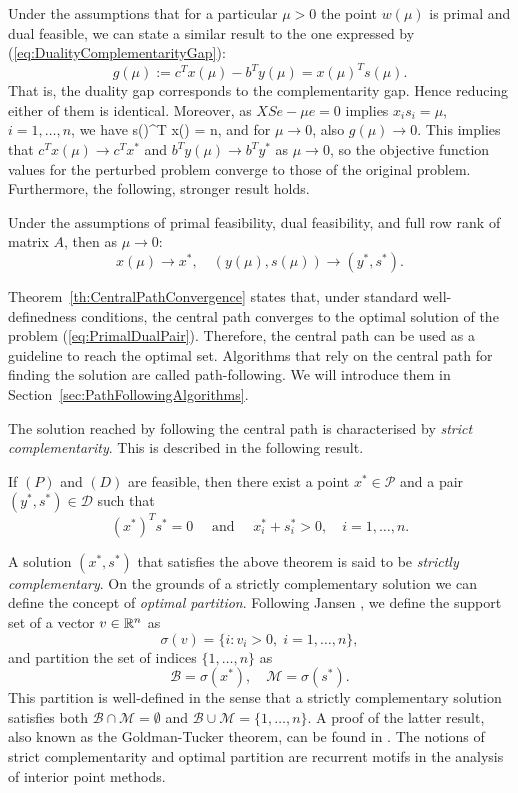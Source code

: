 
Under the assumptions that for a particular $\mu > 0$ the point
$w(\mu)$ is primal and dual feasible, we can state
a similar result to the one expressed by 
(\ref{eq:DualityComplementarityGap}):
\[
  g(\mu) := c^Tx(\mu) - b^T y(\mu) = x(\mu)^T s(\mu).
\]
That is, the duality gap corresponds to the complementarity gap.
Hence reducing either of them is identical.
Moreover, as $XSe - \mu e = 0$ implies $x_is_i = \mu$, $i = 1, \ldots, n$, 
we have
\be  \label{eq:AverageComplementarity}
   s(\mu)^T x(\mu) = n\mu,
\ee
and for $\mu \to 0$, also $g(\mu) \to 0$.
This implies that $c^Tx(\mu)\to c^Tx^*$ and $b^Ty(\mu) \to b^Ty^*$ 
as $\mu\to 0$, so the objective function values for the perturbed
problem converge to those of the original problem.
Furthermore, the following, stronger result holds.
%
\begin{theorem}
\label{th:CentralPathConvergence}
Under the assumptions of primal feasibility, dual feasibility, and
full row rank of matrix $A$, then as $\mu \to 0$:
\[
   x(\mu) \to x^*, \quad (y(\mu),s(\mu)) \to (y^*, s^*).
\]
\end{theorem}

Theorem~\ref{th:CentralPathConvergence} states that, under standard
well-definedness conditions, the central path converges to 
the optimal solution of the problem (\ref{eq:PrimalDualPair}).
Therefore, the central path can be used as a guideline to
reach the optimal set.
Algorithms that rely on the central path for finding the solution
are called path-following. We will introduce them 
in Section~\ref{sec:PathFollowingAlgorithms}.

The solution reached by following the central path is 
characterised by {\em strict complementarity}. 
This is described in the following result.

\begin{theorem}
If $(P)$ and $(D)$ are feasible, then there exist a point $x^* \in\mathcal{P}$
and a pair $(y^*,s^*) \in \mathcal{D}$ such that
\[
(x^*)^T s^* = 0 \quad\mbox{ and }\quad x^*_i + s_i^* >0, \quad i = 1,\ldots,n.
\]
\end{theorem}

A solution $(x^*,s^*)$ that satisfies the above theorem is said to be
{\em strictly complementary}. 
On the grounds of a strictly complementary
solution we can define the concept of {\em optimal partition}.
Following Jansen \cite{phd:Jansen}, we define the support set
of a vector $v \in \mathbb{R}^n$ as
\[
   \sigma(v) = \{ i : v_i > 0, \; i=1,\ldots,n \},
\]
and partition the set of indices $\{1,\ldots,n \}$ as
\[
   \mathcal{B} = \sigma(x^*), \quad \mathcal{M} = \sigma(s^*).
\]
This partition is well-defined in the sense that a 
strictly complementary solution satisfies both 
$\mathcal{B} \cap \mathcal{M} = \emptyset$ and 
$\mathcal{B} \cup \mathcal{M} = \{1,\ldots,n \}$. 
A proof of the latter result, also known as the Goldman-Tucker theorem, 
can be found in \cite{ipm:Wright97}.
The notions of strict complementarity and optimal partition are
recurrent motifs in the analysis of interior point methods.

